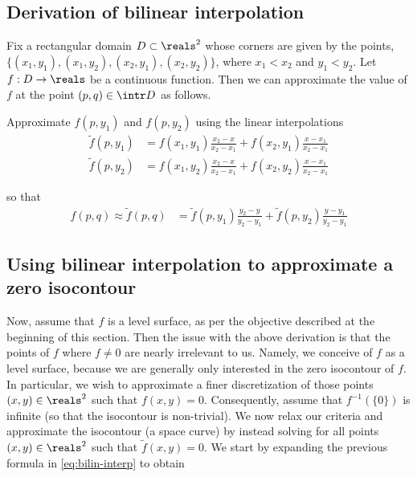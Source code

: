 \documentclass{article}
\begin{document}
\subsection{Derivation of bilinear interpolation}
\label{sec:deriv-bilin-interp}

Fix a rectangular domain $D\subset\reals^2$ whose corners are
given by the points, $\{ (x_1, y_1), (x_1, y_2), (x_2, y_1), (x_2,
y_2) \}$, where $x_1< x_2$ and $y_1<y_2$. Let $f: D \to \reals$ be
a continuous function. Then we can approximate the value of $f$ at
the point $(p,q) \in \intr D$ as follows. 

Approximate $f(p, y_1)$ and $f(p, y_2)$ using the linear
interpolations
\begin{align*}
  \tilde{f}(p, y_1) &= f(x_1, y_1)\frac{x_2-x}{x_2-x_1} +
  f(x_2,y_1)\frac{x-x_1}{x_2-x_1}\\
  \tilde{f}(p, y_2) &= f(x_1, y_2)\frac{x_2-x}{x_2-x_1} +
  f(x_2,y_2)\frac{x-x_1}{x_2-x_1}
\end{align*}

so that
\begin{align}
  \label{eq:bilin-interp}
  f(p,q) \approx \tilde{f}(p,q) &= \tilde{f}(p,
  y_1)\frac{y_2-y}{y_2-y_1} +
  \tilde{f}(p,y_2)\frac{y-y_1}{y_2-y_1}
\end{align}

\subsection{Using bilinear interpolation to approximate a zero isocontour}
\label{sec:using-bilin-interp}

Now, assume that $f$ is a level surface, as per the objective
described at the beginning of this section. Then the issue with
the above derivation is that the points of $f$ where $f\neq 0$ are
nearly irrelevant to us. Namely, we conceive of $f$ as a level
surface, because we are generally only interested in the zero
isocontour of $f$. In particular, we wish to approximate a finer
discretization of those points $(x,y) \in \reals^2$ such that
$f(x,y) = 0$. Consequently, assume that $f^{-1}(\{0\})$ is
infinite (so that the isocontour is non-trivial). We now relax our
criteria and approximate the isocontour (a space curve) by instead
solving for all points $(x,y) \in \reals^2$ such that
$\tilde{f}(x,y) = 0$. We start by expanding the previous formula
in \autoref{eq:bilin-interp} to obtain
\end{document}
